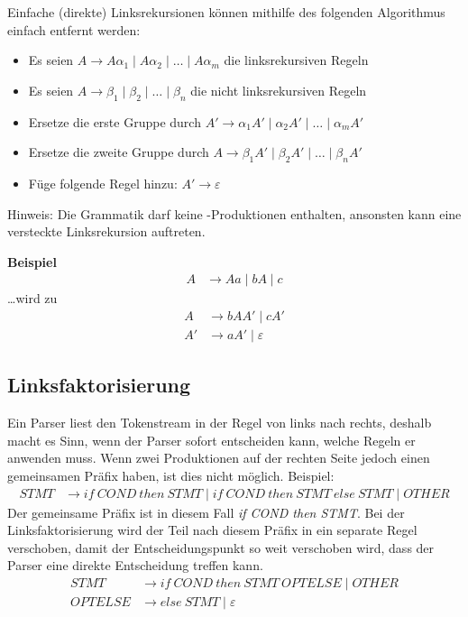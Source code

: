 Einfache (direkte) Linksrekursionen können mithilfe des folgenden Algorithmus einfach entfernt
werden:

\begin{itemize}
	\item Es seien $A \rightarrow A\alpha_1 \mid A\alpha_2 \mid \ldots \mid A\alpha_m$ die
		linksrekursiven Regeln
	\item Es seien $A \rightarrow \beta_1 \mid \beta_2 \mid \ldots \mid \beta_n$ die nicht
		linksrekursiven Regeln
	\item Ersetze die erste Gruppe durch $A' \rightarrow \alpha_1A'\mid \alpha_2A' \mid \ldots \mid
		\alpha_mA'$
	\item Ersetze die zweite Gruppe durch $A \rightarrow \beta_1A' \mid \beta_2A' \mid \ldots \mid
		\beta_nA'$
	\item Füge folgende Regel hinzu: $A' \rightarrow \varepsilon$
\end{itemize}

Hinweis: Die Grammatik darf keine \textepsilon-Produktionen enthalten, ansonsten kann eine
versteckte Linksrekursion auftreten.

\textbf{Beispiel}
%
\begin{align*}
	A &\rightarrow Aa \mid bA \mid c
\end{align*}
%
\ldots{wird} zu
%
\begin{align*}
	A  &\rightarrow bAA' \mid cA' \\
	A' &\rightarrow aA' \mid \varepsilon 
\end{align*}


\subsection{Linksfaktorisierung}

Ein Parser liest den Tokenstream in der Regel von links nach rechts, deshalb
macht es Sinn, wenn der Parser sofort entscheiden kann, welche Regeln er
anwenden muss.  Wenn zwei Produktionen auf der rechten Seite jedoch einen
gemeinsamen Präfix haben, ist dies nicht möglich. Beispiel:
%
\begin{align*}
	STMT &\rightarrow if~COND~then~STMT \mid if~COND~then~STMT~else~STMT \mid OTHER
\end{align*}
%
Der gemeinsame Präfix ist in diesem Fall \textit{if COND then STMT}. Bei der
Linksfaktorisierung wird der Teil nach diesem Präfix in ein separate Regel
verschoben, damit der Entscheidungspunkt so weit verschoben wird, dass der
Parser eine direkte Entscheidung treffen kann.
%
\begin{align*}
	STMT &\rightarrow if~COND~then~STMT~OPTELSE \mid OTHER \\
	OPTELSE &\rightarrow else~STMT \mid \varepsilon
\end{align*}
%


